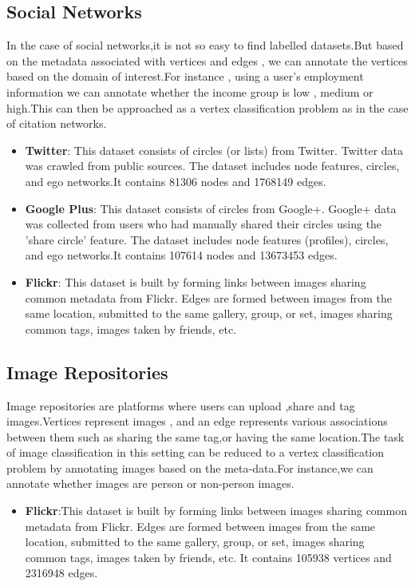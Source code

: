 \documentclass{article}
\begin{document}
\subsection*{Social Networks}
In the case of social networks,it is not so easy to find labelled datasets.But based on the metadata associated with vertices and edges , we can annotate the vertices based on the domain of interest.For instance , using a user's employment information we can annotate whether the income group is low , medium or high.This can then be approached as a vertex classification problem as in the case of citation networks. 
\begin{itemize}
\item \textbf{Twitter}: This dataset consists of circles (or lists) from Twitter. Twitter data was crawled from public sources. The dataset includes node features, circles, and ego networks.It contains 81306 nodes and 1768149 edges.
\item \textbf{Google Plus}: This dataset consists of circles from Google+. Google+ data was collected from users who had manually shared their circles using the 'share circle' feature. The dataset includes node features (profiles), circles, and ego networks.It contains 107614 nodes and 13673453 edges.
\item \textbf{Flickr}: This dataset is built by forming links between images sharing common metadata from Flickr. Edges are formed between images from the same location, submitted to the same gallery, group, or set, images sharing common tags, images taken by friends, etc.
\end{itemize}
\subsection*{Image Repositories}
Image repositories are platforms where users can upload ,share and tag images.Vertices represent images , and an edge represents various associations between them such as sharing the same tag,or having the same location.The task of image classification in this setting can be reduced to a vertex classification problem by annotating images based on the meta-data.For instance,we can annotate whether images are person or non-person images. 
\begin{itemize}
\item \textbf{Flickr}:This dataset is built by forming links between images sharing common metadata from Flickr. Edges are formed between images from the same location, submitted to the same gallery, group, or set, images sharing common tags, images taken by friends, etc.
It contains 105938 vertices and 2316948 edges.
\end{itemize}  
\end{document}
